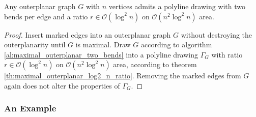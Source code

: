 \begin{theorem}
	Any outerplanar graph $G$ with $n$ vertices admits a polyline drawing with two bends per edge and a ratio $r\in \mathcal{O}(\log^2 n)$ on $\mathcal{O}(n^2 \log^2 n)$ area.
\end{theorem}
\begin{proof}
	Insert marked edges into an outerplanar graph $G$ without destroying the outerplanarity until $G$ is maximal. Draw $G$ according to algorithm \ref{al:maximal_outerplanar_two_bends} into a polyline drawing $\Gamma_{G}$ with ratio $r\in \mathcal{O}(\log^2 n)$ on $\mathcal{O}(n^2 \log^2 n)$ area, according to theorem \ref{th:maximal_outerplanar_log2_n_ratio}. Removing the marked edges from $G$ again does not alter the properties of $\Gamma_{G}$. 
\end{proof}
\newpage
\subsubsection{An Example}

